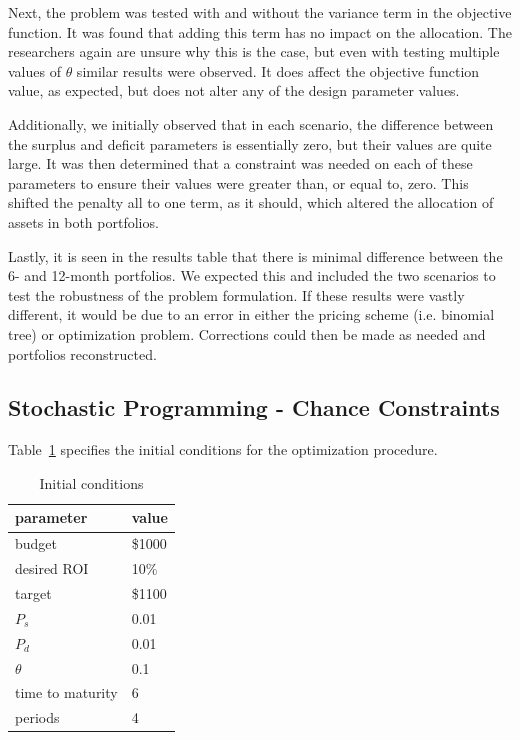 \documentclass[12pt]{article}
\begin{document}
	Next, the problem was tested with and without the variance term in the objective function. It was found that adding this term has no impact on the allocation. The researchers again are unsure why this is the case, but even with testing multiple values of $\theta$ similar results were observed. It does affect the objective function value, as expected, but does not alter any of the design parameter values.
	
	Additionally, we initially observed that in each scenario, the difference between the surplus and deficit parameters is essentially zero, but their values are quite large. It was then determined that a constraint was needed on each of these parameters to ensure their values were greater than, or equal to, zero. This shifted the penalty all to one term, as it should, which altered the allocation of assets in both portfolios.
	
	Lastly, it is seen in the results table that there is minimal difference between the 6- and 12-month portfolios. We expected this and included the two scenarios to test the robustness of the problem formulation. If these results were vastly different, it would be due to an error in either the pricing scheme (i.e. binomial tree) or optimization problem. Corrections could then be made as needed and portfolios reconstructed.

\subsection{Stochastic Programming - Chance Constraints}
Table~\ref{tab:init_cond2} specifies the initial conditions for the optimization procedure.
\begin{table}[H]
	\centering
    \begin{tabular}{|l|l|}
    \hline
    	\textbf{parameter} & \textbf{value} \\ \hline
    	budget & \$1000 \\ \hline
	desired ROI & 10\% \\ \hline
	target & \$1100 \\ \hline
	$P_s$ & 0.01 \\ \hline
	$P_d$ & 0.01 \\ \hline
	$\theta$ & 0.1 \\ \hline
	time to maturity & 6\\ \hline
	periods & 4 \\ \hline
    \end{tabular}
    \caption {Initial conditions}
    \label{tab:init_cond2} 
\end{table}
\end{document}
